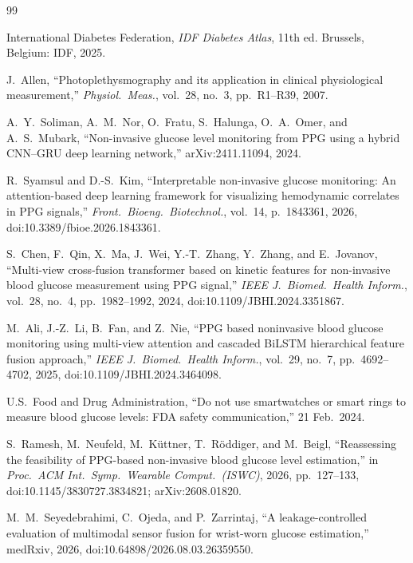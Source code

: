 \documentclass[journal]{IEEEtran}
\begin{document}
\begin{thebibliography}{99}

International Diabetes Federation, \emph{IDF Diabetes Atlas}, 11th ed.
Brussels, Belgium: IDF, 2025.

J.~Allen, ``Photoplethysmography and its application in clinical
physiological measurement,'' \emph{Physiol.\ Meas.}, vol.~28, no.~3,
pp.~R1--R39, 2007.

A.~Y.~Soliman, A.~M.~Nor, O.~Fratu, S.~Halunga, O.~A.~Omer, and A.~S.~Mubark,
``Non-invasive glucose level monitoring from PPG using a hybrid CNN--GRU
deep learning network,'' arXiv:2411.11094, 2024.

R.~Syamsul and D.-S.~Kim, ``Interpretable non-invasive glucose monitoring: An
attention-based deep learning framework for visualizing hemodynamic
correlates in PPG signals,'' \emph{Front.\ Bioeng.\ Biotechnol.}, vol.~14,
p.~1843361, 2026, doi:10.3389/fbioe.2026.1843361.

S.~Chen, F.~Qin, X.~Ma, J.~Wei, Y.-T.~Zhang, Y.~Zhang, and E.~Jovanov,
``Multi-view cross-fusion transformer based on
kinetic features for non-invasive blood glucose measurement using PPG
signal,'' \emph{IEEE J.\ Biomed.\ Health Inform.}, vol.~28, no.~4,
pp.~1982--1992, 2024, doi:10.1109/JBHI.2024.3351867.

M.~Ali, J.-Z.~Li, B.~Fan, and Z.~Nie, ``PPG based noninvasive blood glucose monitoring using
multi-view attention and cascaded BiLSTM hierarchical feature fusion
approach,'' \emph{IEEE J.\ Biomed.\ Health Inform.}, vol.~29, no.~7,
pp.~4692--4702, 2025, doi:10.1109/JBHI.2024.3464098.

U.S.\ Food and Drug Administration, ``Do not use smartwatches or smart rings
to measure blood glucose levels: FDA safety communication,'' 21 Feb.\ 2024.

S.~Ramesh, M.~Neufeld, M.~K\"uttner, T.~R\"oddiger, and M.~Beigl,
``Reassessing the feasibility of PPG-based non-invasive blood glucose level
estimation,'' in \emph{Proc.\ ACM Int.\ Symp.\ Wearable Comput.\ (ISWC)},
2026, pp.~127--133, doi:10.1145/3830727.3834821; arXiv:2608.01820.

M.~M.~Seyedebrahimi, C.~Ojeda, and P.~Zarrintaj, ``A leakage-controlled
evaluation of multimodal sensor fusion for wrist-worn glucose estimation,''
medRxiv, 2026, doi:10.64898/2026.08.03.26359550.


\end{thebibliography}
\end{document}

